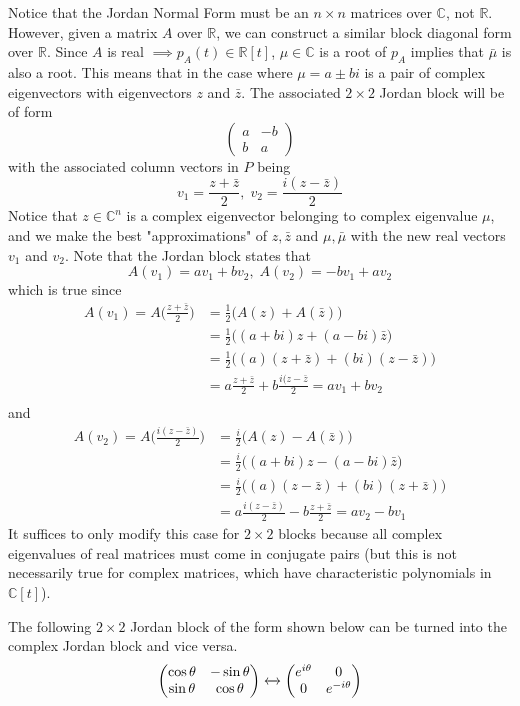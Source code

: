   Notice that the Jordan Normal Form must be an $n \times n$ matrices over $\mathbb{C}$, not $\mathbb{R}$. However, given a matrix $A$ over $\mathbb{R}$, we can construct a similar block diagonal form over $\mathbb{R}$. Since $A$ is real $\implies p_A (t) \in \mathbb{R}[t]$, $\mu \in \mathbb{C}$ is a root of $p_A$ implies that $\bar{\mu}$ is also a root. This means that in the case where $\mu = a \pm b i$ is a pair of complex eigenvectors with eigenvectors $z$ and $\bar{z}$. The associated $2 \times 2$ Jordan block will be of form
  \[\begin{pmatrix}
  a&-b\\ b&a
  \end{pmatrix}\]
  with the associated column vectors in $P$ being
  \[v_1 = \frac{z + \bar{z}}{2}, \; v_2 = \frac{i (z - \bar{z})}{2}\]
  Notice that $z \in \mathbb{C}^n$ is a complex eigenvector belonging to complex eigenvalue $\mu$, and we make the best "approximations" of $z, \bar{z}$ and $\mu, \bar{\mu}$ with the new real vectors $v_1$ and $v_2$. Note that the Jordan block states that
  \[A(v_1) = a v_1 + b v_2, \; A(v_2) = -b v_1 + a v_2\]
  which is true since 
  \begin{align*}
      A(v_1) = A\Big( \frac{z + \bar{z}}{2} \Big) & = \frac{1}{2} \big( A(z) + A(\bar{z}) \big) \\
      & = \frac{1}{2}\big( (a+bi)z + (a-bi) \bar{z} \big) \\
      & = \frac{1}{2} \big( (a)(z + \bar{z}) + (bi) (z - \bar{z})\big) \\
      & = a \frac{z + \bar{z}}{2} + b \frac{i(z-\bar{z}}{2} = a v_1 + b v_2 \\
  \end{align*}
  and 
  \begin{align*}
      A(v_2) = A \Big( \frac{i(z-\bar{z})}{2} \Big) & = \frac{i}{2} \big( A(z) - A(\bar{z}) \big) \\
      & = \frac{i}{2} \big( (a+bi) z - (a-bi) \bar{z}\big) \\
      & = \frac{i}{2} \big( (a) (z - \bar{z}) + (bi)(z+\bar{z})\big) \\
      & = a \frac{i(z-\bar{z})}{2} - b \frac{z + \bar{z}}{2} = a v_2 - b v_1
  \end{align*}
  It suffices to only modify this case for $2 \times 2$ blocks because all complex eigenvalues of real matrices must come in conjugate pairs (but this is not necessarily true for complex matrices, which have characteristic polynomials in $\mathbb{C}[t]$). 

  \begin{corollary}
  The following $2 \times 2$ Jordan block of the form shown below can be turned into the complex Jordan block and vice versa. 
  \[\begin{pmatrix}
  \cos{\theta} & -\sin{\theta} \\
  \sin{\theta} & \cos{\theta} 
  \end{pmatrix} \xleftrightarrow{} \begin{pmatrix}
  e^{i \theta} & 0 \\
  0 & e^{- i \theta}
  \end{pmatrix}\]
  \end{corollary}

